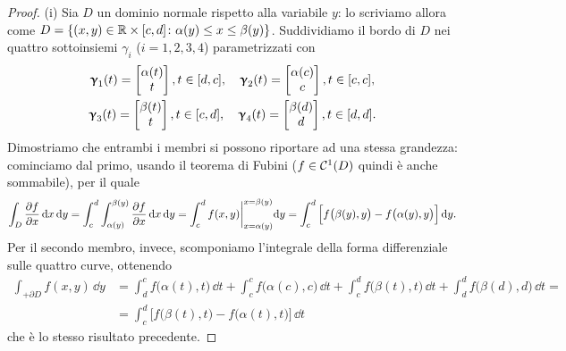 \begin{proof}
	(i) Sia $D$ un dominio normale rispetto alla variabile $y$: lo scriviamo allora come $D=\{(x,y)\in\mathbb{R}\times[c,d]\colon \alpha(y)\leq x\leq\beta(y)\}$.
	Suddividiamo il bordo di $D$ nei quattro sottoinsiemi $\gamma_i$ ($i=1,2,3,4$) parametrizzati con
	\begin{gather*}
		\bm{\upgamma}_1(t)=
		\begin{bmatrix}
			\alpha(t)\\t
		\end{bmatrix}, t\in[d,c],\quad
		\bm{\upgamma}_2(t)=
		\begin{bmatrix}
			\alpha(c)\\c
		\end{bmatrix}, t\in[c,c],\\
		\bm{\upgamma}_3(t)=
		\begin{bmatrix}
			\beta(t)\\t
		\end{bmatrix}, t\in[c,d],\quad 
		\bm{\upgamma}_4(t)=
		\begin{bmatrix}
			\beta(d)\\d
		\end{bmatrix}, t\in[d,d].
	\end{gather*}
	Dimostriamo che entrambi i membri si possono riportare ad una stessa grandezza: cominciamo dal primo, usando il teorema di Fubini ($f\in\mathcal{C}^{{1}}(D)$ quindi è anche sommabile), per il quale
	\begin{equation}
		\int_D\frac{\partial {f}}{\partial {x}}\,\textup{d} x\,\textup{d} y=\int_c^d\int_{\alpha(y)}^{\beta(y)}\frac{\partial {f}}{\partial {x}}\,\textup{d} x\,\textup{d} y=\int_c^df(x,y)\bigg|_{x=\alpha(y)}^{x=\beta(y)}\textup{d} y=\int_c^d\Big[f\big(\beta(y),y\big)-f\big(\alpha(y),y\big)\Big]\,\textup{d} y.
	\end{equation}
	Per il secondo membro, invece, scomponiamo l'integrale della forma differenziale sulle quattro curve, ottenendo
	\begin{equation}
		\begin{split}
			\int_{+\partial D}f(x,y)\,\dd y&=\int_d^cf\big(\alpha(t),t\big)\,\dd t+\int_c^cf\big(\alpha(c),c\big)\,\dd t+\int_c^df\big(\beta(t),t\big)\,\dd t+\int_d^df\big(\beta(d),d\big)\,\dd t=\\
			&=\int_c^d\Big[f\big(\beta(t),t\big)-f\big(\alpha(t),t\big)\Big]\,\dd t
		\end{split}
	\end{equation}
	che è lo stesso risultato precedente.


\end{proof}
